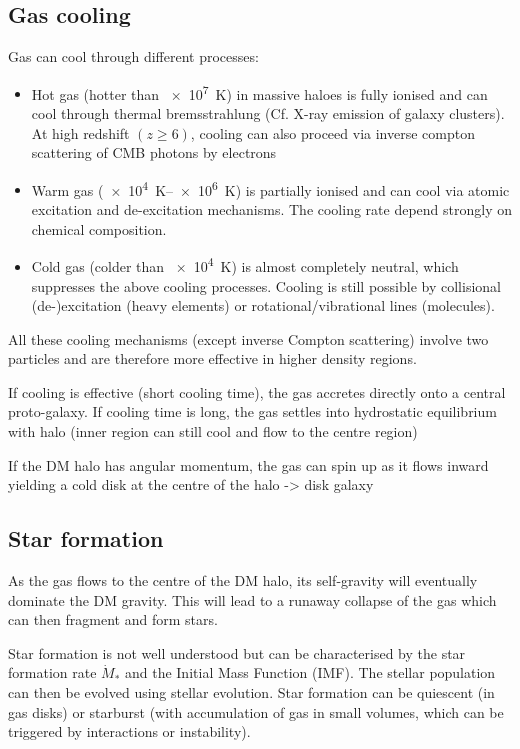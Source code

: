 \subsection{Gas cooling}
Gas can cool through different processes:
\begin{itemize}
	\item  Hot gas (hotter than \SI{e7}{\kelvin}) in massive haloes is fully ionised and can cool through thermal bremsstrahlung (Cf. X-ray emission of galaxy clusters).
	At high redshift $(z 
	\geq 6)$, cooling can also proceed via inverse compton scattering of CMB photons by electrons
	\item Warm gas (\SIrange{e4}{e6}{\kelvin}) is partially ionised and can cool via atomic excitation and de-excitation mechanisms.
	The cooling rate depend strongly on chemical composition.
	\item Cold gas (colder than \SI{e4}{\kelvin}) is almost completely neutral, which suppresses the above cooling processes.
	Cooling is still possible by collisional (de-)excitation (heavy elements) or rotational/vibrational lines (molecules).
\end{itemize}

All these cooling mechanisms (except inverse Compton scattering) involve two particles and are therefore more effective in higher density regions.

If cooling is effective (short cooling time), the gas accretes directly onto a central proto-galaxy.
If cooling time is long, the gas settles into hydrostatic equilibrium with halo (inner region can still cool and flow to the centre region)

If the DM halo has angular momentum, the gas can spin up as it flows inward yielding a cold disk at the centre of the halo -> disk galaxy


\subsection{Star formation}

As the gas flows to the centre of the DM halo, its self-gravity will eventually dominate the DM gravity.
This will lead to a runaway collapse of the gas which can then fragment and form stars.

Star formation is not well understood but can be characterised by the star formation rate $\dot{M}_{*}$ and the Initial Mass Function (IMF).
The stellar population can then be evolved using stellar evolution.
Star formation can be quiescent (in gas disks) or starburst (with accumulation of gas in small volumes, which can be triggered by interactions or instability).


